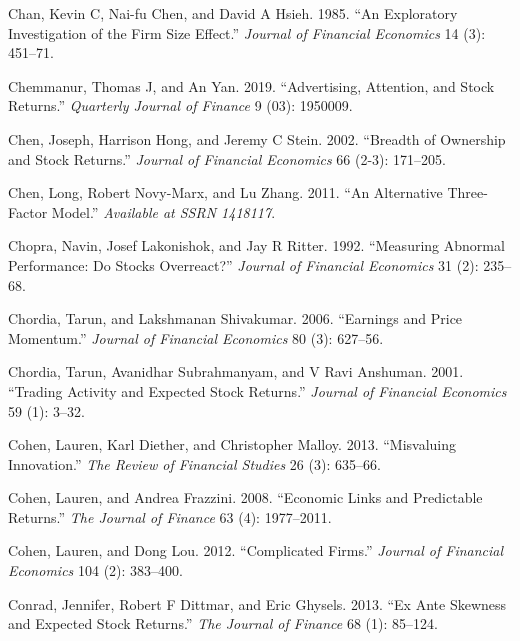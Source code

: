 \documentclass[
  letterpaper,
  DIV=11,
  numbers=noendperiod]{scrreprt}
\newlength{\cslhangindent}
\newlength{\cslentryspacingunit} %
\newenvironment{CSLReferences}[2] %
 {%
  \setlength{\parindent}{0pt}
  \ifodd #1
  \let\oldpar\par
  \def\par{\hangindent=\cslhangindent\oldpar}
  \fi
  \setlength{\parskip}{#2\cslentryspacingunit}
 }%
 {}
\begin{document}
\begin{CSLReferences}{1}{0}
\leavevmode{}%
Chan, Kevin C, Nai-fu Chen, and David A Hsieh. 1985. {``An Exploratory
Investigation of the Firm Size Effect.''} \emph{Journal of Financial
Economics} 14 (3): 451--71.

\leavevmode{}%
Chemmanur, Thomas J, and An Yan. 2019. {``Advertising, Attention, and
Stock Returns.''} \emph{Quarterly Journal of Finance} 9 (03): 1950009.

\leavevmode{}%
Chen, Joseph, Harrison Hong, and Jeremy C Stein. 2002. {``Breadth of
Ownership and Stock Returns.''} \emph{Journal of Financial Economics} 66
(2-3): 171--205.

\leavevmode{}%
Chen, Long, Robert Novy-Marx, and Lu Zhang. 2011. {``An Alternative
Three-Factor Model.''} \emph{Available at SSRN 1418117}.

\leavevmode{}%
Chopra, Navin, Josef Lakonishok, and Jay R Ritter. 1992. {``Measuring
Abnormal Performance: Do Stocks Overreact?''} \emph{Journal of Financial
Economics} 31 (2): 235--68.

\leavevmode{}%
Chordia, Tarun, and Lakshmanan Shivakumar. 2006. {``Earnings and Price
Momentum.''} \emph{Journal of Financial Economics} 80 (3): 627--56.

\leavevmode{}%
Chordia, Tarun, Avanidhar Subrahmanyam, and V Ravi Anshuman. 2001.
{``Trading Activity and Expected Stock Returns.''} \emph{Journal of
Financial Economics} 59 (1): 3--32.

\leavevmode{}%
Cohen, Lauren, Karl Diether, and Christopher Malloy. 2013. {``Misvaluing
Innovation.''} \emph{The Review of Financial Studies} 26 (3): 635--66.

\leavevmode{}%
Cohen, Lauren, and Andrea Frazzini. 2008. {``Economic Links and
Predictable Returns.''} \emph{The Journal of Finance} 63 (4):
1977--2011.

\leavevmode{}%
Cohen, Lauren, and Dong Lou. 2012. {``Complicated Firms.''}
\emph{Journal of Financial Economics} 104 (2): 383--400.

\leavevmode{}%
Conrad, Jennifer, Robert F Dittmar, and Eric Ghysels. 2013. {``Ex Ante
Skewness and Expected Stock Returns.''} \emph{The Journal of Finance} 68
(1): 85--124.


\end{CSLReferences}
\end{document}
